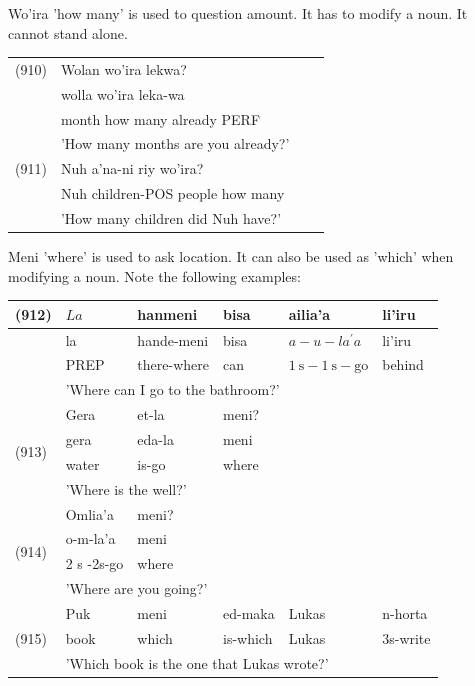 \documentclass[10pt]{article}
\begin{document}
Wo'ira 'how many' is used to question amount. It has to modify a noun. It cannot stand alone.

\begin{center}
\begin{tabular}{llll}
(910) & Wolan wo'ira lekwa? \\
 & wolla wo'ira leka-wa \\
 & month how many already PERF \\
 & 'How many months are you already?' \\
(911) & Nuh a'na-ni riy wo'ira? \\
 & Nuh children-POS people how many \\
 & 'How many children did Nuh have?' \\
\end{tabular}
\end{center}

Meni 'where' is used to ask location. It can also be used as 'which' when modifying a noun. Note the following examples:

\begin{center}
\begin{tabular}{|l|l|l|l|l|l|}
\hline
\multirow[t]{4}{*}{(912)} & \(L a\) & hanmeni & bisa & ailia'a & li’iru \\
\hline
 & la & hande-meni & bisa & \(a-u-l a^{\prime} a\) & li’iru \\
\hline
 & PREP & there-where & can & \(1 \mathrm{~s}-1 \mathrm{~s}-\mathrm{go}\) & behind \\
\hline
 & \multicolumn{5}{|l|}{'Where can I go to the bathroom?'} \\
\hline
\multirow[t]{4}{*}{(913)} & Gera & et-la & meni? &  &  \\
\hline
 & gera & eda-la & meni &  &  \\
\hline
 & water & is-go & where &  &  \\
\hline
 & \multicolumn{5}{|l|}{'Where is the well?'} \\
\hline
\multirow[t]{4}{*}{(914)} & Omlia'a & meni? &  &  &  \\
\hline
 & o-m-la'a & meni &  &  &  \\
\hline
 & 2 s -2s-go & where &  &  &  \\
\hline
 & \multicolumn{5}{|l|}{'Where are you going?'} \\
\hline
\multirow[t]{3}{*}{(915)} & Puk & meni & ed-maka & Lukas & n-horta \\
\hline
 & book & which & is-which & Lukas & 3s-write \\
\hline
 & \multicolumn{5}{|l|}{'Which book is the one that Lukas wrote?'} \\
\hline
\end{tabular}
\end{center}
\end{document}
